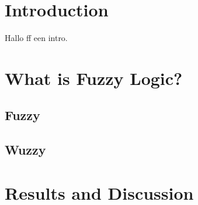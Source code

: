 \documentclass[fleqn,10pt]{SelfArx} %
\begin{document}
\flushbottom %

\maketitle %

\tableofcontents %

\thispagestyle{empty} %


\section*{Introduction} %


Hallo ff een intro.


\section{What is Fuzzy Logic?}
\subsection{Fuzzy}
\subsection{Wuzzy}




\section{Results and Discussion}
\end{document}
